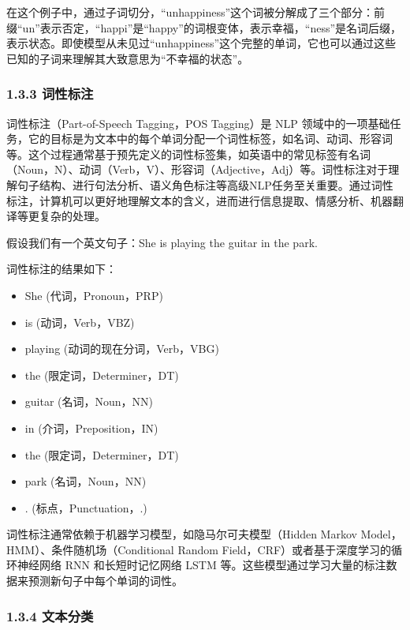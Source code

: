 \documentclass[12pt,a4paper]{book}
\begin{document}
在这个例子中，通过子词切分，``unhappiness''这个词被分解成了三个部分：前缀``un''表示否定，``happi''是``happy''的词根变体，表示幸福，``ness''是名词后缀，表示状态。即使模型从未见过``unhappiness''这个完整的单词，它也可以通过这些已知的子词来理解其大致意思为``不幸福的状态''。

\subsubsection{1.3.3 词性标注}\label{ux8bcdux6027ux6807ux6ce8}

词性标注（Part-of-Speech Tagging，POS Tagging）是 NLP
领域中的一项基础任务，它的目标是为文本中的每个单词分配一个词性标签，如名词、动词、形容词等。这个过程通常基于预先定义的词性标签集，如英语中的常见标签有名词（Noun，N）、动词（Verb，V）、形容词（Adjective，Adj）等。词性标注对于理解句子结构、进行句法分析、语义角色标注等高级NLP任务至关重要。通过词性标注，计算机可以更好地理解文本的含义，进而进行信息提取、情感分析、机器翻译等更复杂的处理。

假设我们有一个英文句子：She is playing the guitar in the park.

词性标注的结果如下：

\begin{itemize}
\tightlist
\item
  She (代词，Pronoun，PRP)
\item
  is (动词，Verb，VBZ)
\item
  playing (动词的现在分词，Verb，VBG)
\item
  the (限定词，Determiner，DT)
\item
  guitar (名词，Noun，NN)
\item
  in (介词，Preposition，IN)
\item
  the (限定词，Determiner，DT)
\item
  park (名词，Noun，NN)
\item
  . (标点，Punctuation，.)
\end{itemize}

词性标注通常依赖于机器学习模型，如隐马尔可夫模型（Hidden Markov
Model，HMM）、条件随机场（Conditional Random
Field，CRF）或者基于深度学习的循环神经网络 RNN 和长短时记忆网络 LSTM
等。这些模型通过学习大量的标注数据来预测新句子中每个单词的词性。

\subsubsection{1.3.4 文本分类}\label{ux6587ux672cux5206ux7c7b}
\end{document}
